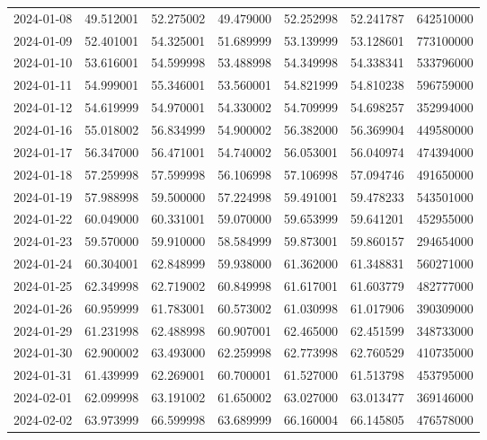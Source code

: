 \begin{tabular}{lrrrrrr}
2024-01-08 &   49.512001 &   52.275002 &   49.479000 &   52.252998 &   52.241787 &   642510000 \\
2024-01-09 &   52.401001 &   54.325001 &   51.689999 &   53.139999 &   53.128601 &   773100000 \\
2024-01-10 &   53.616001 &   54.599998 &   53.488998 &   54.349998 &   54.338341 &   533796000 \\
2024-01-11 &   54.999001 &   55.346001 &   53.560001 &   54.821999 &   54.810238 &   596759000 \\
2024-01-12 &   54.619999 &   54.970001 &   54.330002 &   54.709999 &   54.698257 &   352994000 \\
2024-01-16 &   55.018002 &   56.834999 &   54.900002 &   56.382000 &   56.369904 &   449580000 \\
2024-01-17 &   56.347000 &   56.471001 &   54.740002 &   56.053001 &   56.040974 &   474394000 \\
2024-01-18 &   57.259998 &   57.599998 &   56.106998 &   57.106998 &   57.094746 &   491650000 \\
2024-01-19 &   57.988998 &   59.500000 &   57.224998 &   59.491001 &   59.478233 &   543501000 \\
2024-01-22 &   60.049000 &   60.331001 &   59.070000 &   59.653999 &   59.641201 &   452955000 \\
2024-01-23 &   59.570000 &   59.910000 &   58.584999 &   59.873001 &   59.860157 &   294654000 \\
2024-01-24 &   60.304001 &   62.848999 &   59.938000 &   61.362000 &   61.348831 &   560271000 \\
2024-01-25 &   62.349998 &   62.719002 &   60.849998 &   61.617001 &   61.603779 &   482777000 \\
2024-01-26 &   60.959999 &   61.783001 &   60.573002 &   61.030998 &   61.017906 &   390309000 \\
2024-01-29 &   61.231998 &   62.488998 &   60.907001 &   62.465000 &   62.451599 &   348733000 \\
2024-01-30 &   62.900002 &   63.493000 &   62.259998 &   62.773998 &   62.760529 &   410735000 \\
2024-01-31 &   61.439999 &   62.269001 &   60.700001 &   61.527000 &   61.513798 &   453795000 \\
2024-02-01 &   62.099998 &   63.191002 &   61.650002 &   63.027000 &   63.013477 &   369146000 \\
2024-02-02 &   63.973999 &   66.599998 &   63.689999 &   66.160004 &   66.145805 &   476578000 \\

\end{tabular}
